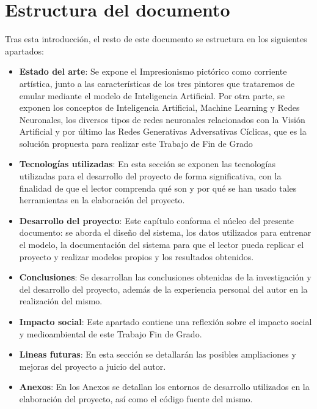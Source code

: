 \documentclass[../main.tex]{subfiles}
\begin{document}
\section{Estructura del documento}
Tras esta introducción, el resto de este documento se estructura en los siguientes apartados:
\begin{itemize}
    \item \textbf{Estado del arte}: Se expone el Impresionismo pictórico como corriente artística, junto a las características de los tres pintores que trataremos de emular mediante el modelo de Inteligencia Artificial. Por otra parte, se exponen los conceptos de Inteligencia Artificial, Machine Learning y Redes Neuronales, los diversos tipos de redes neuronales relacionados con la Visión Artificial y por último las Redes Generativas Adversativas Cíclicas, que es la solución propuesta para realizar este Trabajo de Fin de Grado
    \item \textbf{Tecnologías utilizadas}: En esta sección se exponen las tecnologías utilizadas para el desarrollo del proyecto de forma significativa, con la finalidad de que el lector comprenda qué son y por qué se han usado tales herramientas en la elaboración del proyecto.
    \item \textbf{Desarrollo del proyecto}: Este capítulo conforma el núcleo del presente documento: se aborda el diseño del sistema, los datos utilizados para entrenar el modelo, la documentación del sistema para que el lector pueda replicar el proyecto y realizar modelos propios y los resultados obtenidos.
    \item \textbf{Conclusiones}: Se desarrollan las conclusiones obtenidas de la investigación y del desarrollo del proyecto, además de la experiencia personal del autor en la realización del mismo.
    \item \textbf{Impacto social}: Este apartado contiene una reflexión sobre el impacto social y medioambiental de este Trabajo Fin de Grado.
    \item \textbf{Lineas futuras}: En esta sección se detallarán las posibles ampliaciones y mejoras del proyecto a juicio del autor. 
    \item \textbf{Anexos}: En los Anexos se detallan los entornos de desarrollo utilizados en la elaboración del proyecto, así como el código fuente del mismo.
\end{itemize}
\end{document}

